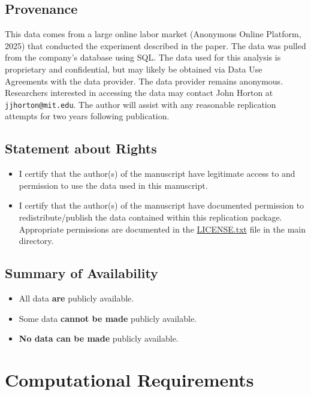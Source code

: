 \documentclass[10pt]{article}
\begin{document}
\subsection{Provenance}
This data comes from a large online labor market (Anonymous Online Platform, 2025) that conducted the experiment described in the paper. The data was pulled from the company's database using SQL. The data used for this analysis is proprietary and confidential, but may likely be obtained via Data Use Agreements with the data provider. The data provider remains anonymous. Researchers interested in accessing the data may contact John Horton at \texttt{jjhorton@mit.edu}. The author will assist with any reasonable replication attempts for two years following publication.

\subsection{Statement about Rights}
\begin{itemize}[label=]
  \item [\ding{51}] I certify that the author(s) of the manuscript have legitimate access to and permission to use the data used in this manuscript.
  \item I certify that the author(s) of the manuscript have documented permission to redistribute/publish the data contained within this replication package. Appropriate permissions are documented in the \href{https://www.github.com/johnjosephhorton/minimum_wage/blob/main/LICENSE.txt}{LICENSE.txt} file in the main directory.
\end{itemize}

\subsection{Summary of Availability}
\begin{itemize}[label=]
  \item All data \textbf{are} publicly available.
  \item Some data \textbf{cannot be made} publicly available.
  \item [\ding{51}] \textbf{No data can be made} publicly available.
\end{itemize}

\section{Computational Requirements}
\end{document}
